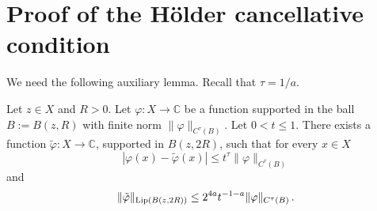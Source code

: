 \chapter{Proof of the H\"older cancellative condition}
\label{liphoel}

We need the following auxiliary lemma.
Recall that $\tau = 1/a$.

\begin{lemma}
    \label{Lipschitz-Holder-approximation}
    \leanok
    Let $z\in X$ and $R>0$. Let $\varphi: X \to \mathbb{C}$ be a function supported in the ball
    $B:=B(z,R)$ with finite norm $\|\varphi\|_{C^\tau(B)}$. Let $0<t \leq 1$. There exists a function $\tilde \varphi : X \to \mathbb{C}$, supported in $B(z,2R)$, such that for every $x\in X$
    \begin{equation}\label{eq-firstt}
        |\varphi(x) - \tilde \varphi(x)| \leq t^{\tau} \|\varphi\|_{C^\tau(B)}
    \end{equation}and
   \begin{equation}\label{eq-secondt}
       \|\tilde \varphi\|_{\operatorname{\operatorname{Lip}}(B(z,2R))} \leq 2^{4a}t^{-1-a} \|\varphi\|_{C^{\tau}(B)}\, .
   \end{equation}
\end{lemma}



